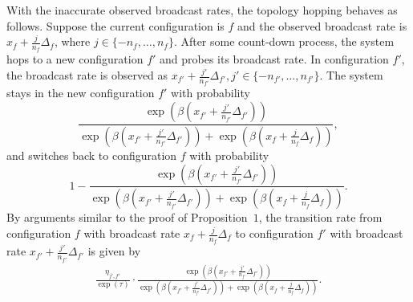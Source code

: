 \documentclass[10pt,conference]{IEEEtran}
\begin{document}
With the inaccurate observed broadcast rates, the topology hopping
behaves as follows. Suppose the current configuration is $f$ and
the observed broadcast rate is $x_{f}+\frac{j}{n_{f}}\Delta_{f}$,
where $j\in\{-n_{f},\ldots,n_{f}\}$. After some count-down process,
the system hops to a new configuration $f'$ and probes its broadcast
rate. In configuration $f'$, the broadcast rate is observed as $x_{f'}+\frac{j'}{n_{f'}}\Delta_{f'},j'\in\{-n_{f'},\ldots,n_{f'}\}$.
The system stays in the new configuration $f'$ with probability \[
\frac{\exp(\beta(x_{f'}+\frac{j'}{n_{f'}}\Delta_{f'}))}{\exp(\beta(x_{f'}+\frac{j'}{n_{f'}}\Delta_{f'}))+\exp(\beta(x_{f}+\frac{j}{n_{f}}\Delta_{f}))},\]
and switches back to configuration $f$ with probability \[
1-\frac{\exp(\beta(x_{f'}+\frac{j'}{n_{f'}}\Delta_{f'}))}{\exp(\beta(x_{f'}+\frac{j'}{n_{f'}}\Delta_{f'}))+\exp(\beta(x_{f}+\frac{j}{n_{f}}\Delta_{f}))}.\]
By arguments similar to the proof of Proposition~$1$, the transition
rate from configuration $f$ with broadcast rate $x_{f}+\frac{j}{n_{f}}\Delta_{f}$
to configuration $f'$ with broadcast rate $x_{f'}+\frac{j'}{n_{f'}}\Delta_{f'}$
is given by \begin{align}
\frac{\eta_{j',f'}}{\exp(\tau)}\cdot\frac{\exp(\beta(x_{f'}+\frac{j'}{n_{f'}}\Delta_{f'}))}{\exp(\beta(x_{f'}+\frac{j'}{n_{f'}}\Delta_{f'}))+\exp(\beta(x_{f}+\frac{j}{n_{f}}\Delta_{f}))}.\end{align}
\end{document}
